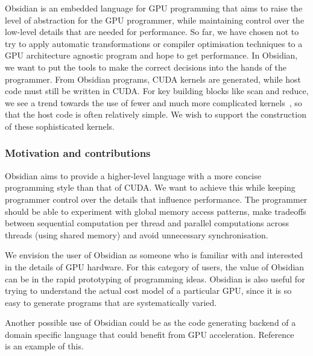Obsidian is an embedded language for GPU programming that aims to raise the 
level of abstraction for the GPU programmer, while maintaining control over 
the low-level details that are needed for performance. 
So far,
we have chosen not to try to apply automatic transformations or compiler 
optimisation techniques to a GPU architecture agnostic program and hope 
to get performance. In Obsidian, we want to put the tools to make the 
correct decisions into the hands of the programmer. From Obsidian programs, 
CUDA kernels are generated, while host code must still be written in CUDA.
For key building blocks like scan and reduce, we see a trend towards
the use of fewer and much more complicated kernels~\cite{merrill}, so
that the host code is often relatively simple. We wish to support the construction of these sophisticated kernels.


\subsubsection{Motivation and contributions} 

Obsidian aims to provide a higher-level language with a more concise programming style than that of CUDA. We want to achieve 
this while keeping programmer control over the details that influence 
performance. The programmer should be able to experiment with global memory 
access patterns, make tradeoffs between sequential computation per thread 
and parallel computations across threads (using shared memory) and avoid 
unnecessary synchronisation. 

We envision the user of Obsidian as someone who is familiar with and 
interested in the details of GPU hardware. For this category of users,
the value of Obsidian can be in the rapid prototyping of programming ideas.
Obsidian is also useful for trying to understand the actual cost model
of a particular GPU, since it is so easy to generate programs that are
systematically varied.

Another possible use of Obsidian could be as the code generating backend of 
a domain specific language that could 
benefit from GPU acceleration. Reference ~\cite{BEAUTY} is an example of this.   
%

